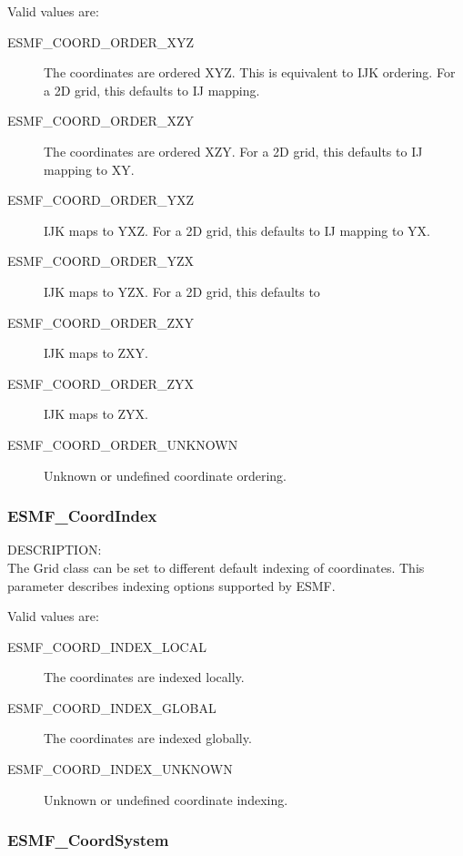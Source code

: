 Valid values are:
\begin{description}
   \item [ESMF\_COORD\_ORDER\_XYZ]
         The coordinates are ordered XYZ.  This is equivalent to IJK ordering.
         For a 2D grid, this defaults to IJ mapping.

   \item [ESMF\_COORD\_ORDER\_XZY]
         The coordinates are ordered XZY.  For a 2D grid, this defaults to IJ mapping to XY.

   \item [ESMF\_COORD\_ORDER\_YXZ]
         IJK maps to YXZ.  For a 2D grid, this defaults to IJ mapping to YX.

   \item [ESMF\_COORD\_ORDER\_YZX]
         IJK maps to YZX.  For a 2D grid, this defaults to

   \item [ESMF\_COORD\_ORDER\_ZXY]
         IJK maps to ZXY.

   \item [ESMF\_COORD\_ORDER\_ZYX]
         IJK maps to ZYX.

   \item [ESMF\_COORD\_ORDER\_UNKNOWN]
         Unknown or undefined coordinate ordering.
\end{description}

\subsubsection{ESMF\_CoordIndex}

{\sf DESCRIPTION:\\}
The Grid class can be set to different default indexing of coordinates.  This
parameter describes indexing options supported by ESMF.

Valid values are:
\begin{description}
   \item [ESMF\_COORD\_INDEX\_LOCAL]
         The coordinates are indexed locally.  

   \item [ESMF\_COORD\_INDEX\_GLOBAL]
         The coordinates are indexed globally.

   \item [ESMF\_COORD\_INDEX\_UNKNOWN]
         Unknown or undefined coordinate indexing.
\end{description}

\subsubsection{ESMF\_CoordSystem}

